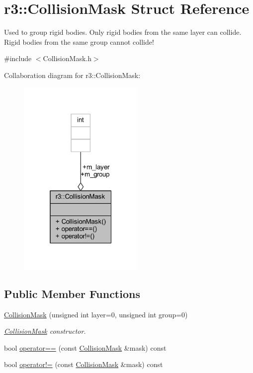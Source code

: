 \hypertarget{structr3_1_1_collision_mask}{}\section{r3\+:\+:Collision\+Mask Struct Reference}
\label{structr3_1_1_collision_mask}


Used to group rigid bodies. Only rigid bodies from the same layer can collide. Rigid bodies from the same group cannot collide!  




{\ttfamily \#include $<$Collision\+Mask.\+h$>$}



Collaboration diagram for r3\+:\+:Collision\+Mask\+:\nopagebreak
\begin{figure}[H]
\begin{center}
\leavevmode
\includegraphics[width=172pt]{structr3_1_1_collision_mask__coll__graph}
\end{center}
\end{figure}
\subsection*{Public Member Functions}
\begin{DoxyCompactItemize}
\item 
\mbox{\hyperlink{structr3_1_1_collision_mask_a7f1fb1fae3d7e14677ad2590fcd661e0}{Collision\+Mask}} (unsigned int layer=0, unsigned int group=0)
\begin{DoxyCompactList}\small\item\em \mbox{\hyperlink{structr3_1_1_collision_mask}{Collision\+Mask}} constructor. \end{DoxyCompactList}\item 
bool \mbox{\hyperlink{structr3_1_1_collision_mask_a7d1315f7324fc03cee09df2c364f5c54}{operator==}} (const \mbox{\hyperlink{structr3_1_1_collision_mask}{Collision\+Mask}} \&mask) const
\item 
bool \mbox{\hyperlink{structr3_1_1_collision_mask_ae6bbe0e4390b584497c854d39ec12c6a}{operator!=}} (const \mbox{\hyperlink{structr3_1_1_collision_mask}{Collision\+Mask}} \&mask) const
\end{DoxyCompactItemize}

